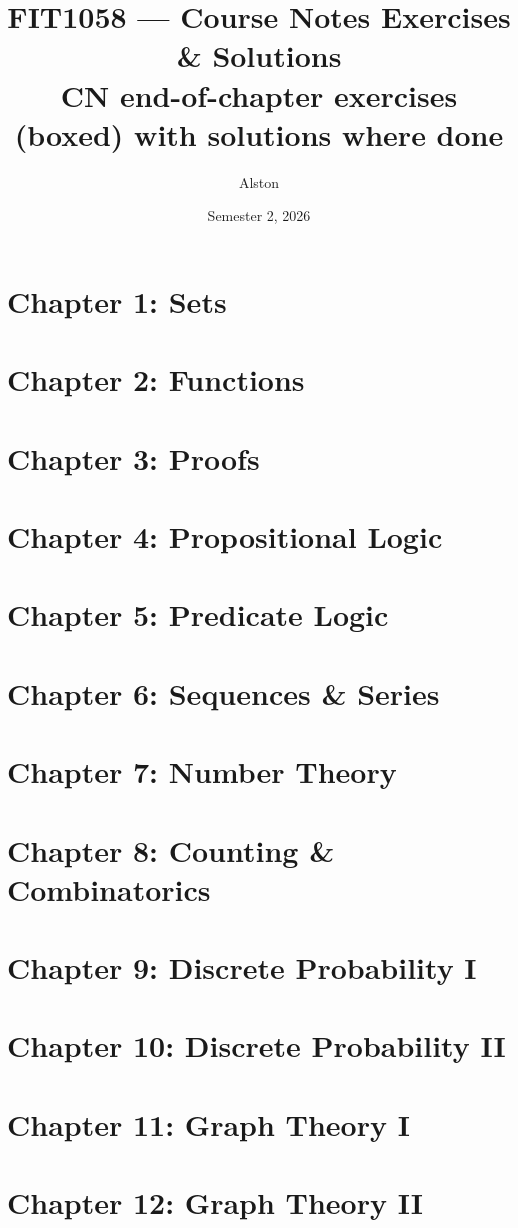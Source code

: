\documentclass[11pt]{article}
\title{FIT1058 --- Course Notes Exercises \& Solutions\\
\large CN end-of-chapter exercises (boxed) with solutions where done}
\author{Alston}
\date{Semester 2, 2026}
\begin{document}
\maketitle
\tableofcontents

\newpage
\section{Chapter 1: Sets}


\newpage
\section{Chapter 2: Functions}


\newpage
\section{Chapter 3: Proofs}


\newpage
\section{Chapter 4: Propositional Logic}


\newpage
\section{Chapter 5: Predicate Logic}


\newpage
\section{Chapter 6: Sequences \& Series}


\newpage
\section{Chapter 7: Number Theory}


\newpage
\section{Chapter 8: Counting \& Combinatorics}


\newpage
\section{Chapter 9: Discrete Probability I}


\newpage
\section{Chapter 10: Discrete Probability II}


\newpage
\section{Chapter 11: Graph Theory I}


\newpage
\section{Chapter 12: Graph Theory II}

\end{document}
